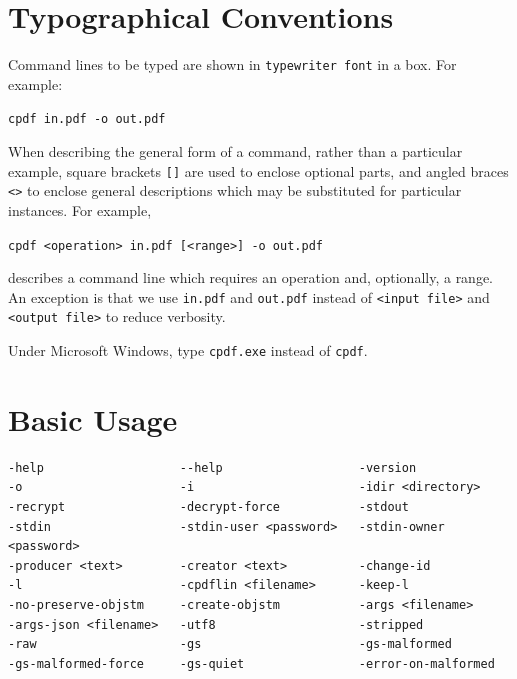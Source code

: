 \documentclass{book}
\begin{document}
\pagestyle{plain}
\tableofcontents\clearpage\pagestyle{empty}

\cleardoublepage
\pagestyle{plain}
\chapter*{Typographical Conventions}
Command lines to be typed are shown in \texttt{typewriter\hspace{-1mm} font} in a box.
For example:

\begin{framed}
\noindent\small\verb!cpdf in.pdf -o out.pdf!
\end{framed}

\noindent When describing the general form of a command, rather than a particular
example, square brackets \verb|[]| are used to enclose optional parts, and
angled braces \verb!<>! to enclose general descriptions which may be
substituted for particular instances. For example,

\begin{framed}
\noindent\small\verb!cpdf <operation> in.pdf [<range>] -o out.pdf!
\end{framed}

\noindent describes a command line which requires an operation and, optionally,
a range. An exception is that we use \texttt{in.pdf} and \texttt{out.pdf}
instead of \texttt{<input file>} and \texttt{<output file>} to reduce
verbosity.

Under Microsoft Windows, type \texttt{cpdf.exe} instead of \texttt{cpdf}.
\clearpage\pagestyle{empty}\cleardoublepage
\mainmatter
\pagestyle{fancy}



\chapter{Basic Usage}\label{chap:1}


\label{basicusage}
  \begin{framed}
  \small
\noindent\begin{verbatim}
-help                   --help                   -version 
-o                      -i                       -idir <directory>
-recrypt                -decrypt-force           -stdout
-stdin                  -stdin-user <password>   -stdin-owner <password>  
-producer <text>        -creator <text>          -change-id
-l                      -cpdflin <filename>      -keep-l
-no-preserve-objstm     -create-objstm           -args <filename>
-args-json <filename>   -utf8                    -stripped
-raw                    -gs                      -gs-malformed
-gs-malformed-force     -gs-quiet                -error-on-malformed\end{verbatim}\end{framed}
\end{document}
